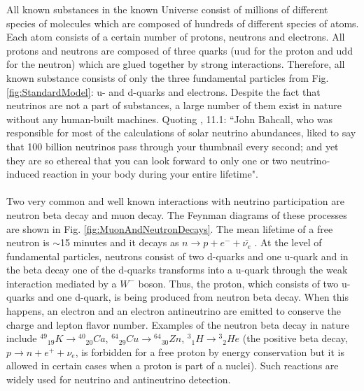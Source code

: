 All known substances in the known Universe consist of millions of different species of molecules which are composed of hundreds of different species of atoms. Each atom consists of a certain number of protons, neutrons and electrons. All protons and neutrons are composed of three quarks (uud for the proton and udd for the neutron) which are glued together by strong interactions. Therefore, all known substance consists of only the three fundamental particles from Fig. \ref{fig:StandardModel}: u- and d-quarks and electrons. Despite the fact that neutrinos are not a part of substances, a large number of them exist in nature without any human-built machines. Quoting \cite{ref_Griffiths}, 11.1: ``John Bahcall, who was responsible for most of the calculations of solar neutrino abundances, liked to say that 100 billion neutrinos pass through your thumbnail every second; and yet they are so ethereal that you can look forward to only one or two neutrino-induced reaction in your body during your entire lifetime".\\ \\
Two very common and well known interactions with neutrino participation are neutron beta decay and muon decay. The Feynman diagrams of these processes are shown in Fig. \ref{fig:MuonAndNeutronDecays}. The mean lifetime of a free neutron is $\sim$15 minutes and it decays as $n \rightarrow p + e^- + \bar{{\nu}_e} $ \cite{ref_PDG}. At the level of fundamental particles, neutrons consist of two d-quarks and one u-quark and in the beta decay one of the d-quarks transforms into a u-quark through the weak interaction mediated by a $W^- $ boson. Thus, the proton, which consists of two u-quarks and one d-quark, is being produced from neutron beta decay. When this happens, an electron and an electron antineutrino are emitted to conserve the charge and lepton flavor number. Examples of the neutron beta decay in nature include ${^{49}}{_{19}}K \rightarrow {^{40}}{_{20}}Ca$, ${^{64}}{_{29}}Cu \rightarrow {^{64}}{_{30}}Zn$, ${^3}{_1}H \rightarrow {^3}{_2}He$ \cite{ref_Griffiths} (the positive beta decay,  $p \rightarrow n + e^+ + {\nu}_e $, is forbidden for a free proton by energy conservation but it is allowed in certain cases when a proton is part of a nuclei). Such reactions are widely used for neutrino and antineutrino detection.\\\\
